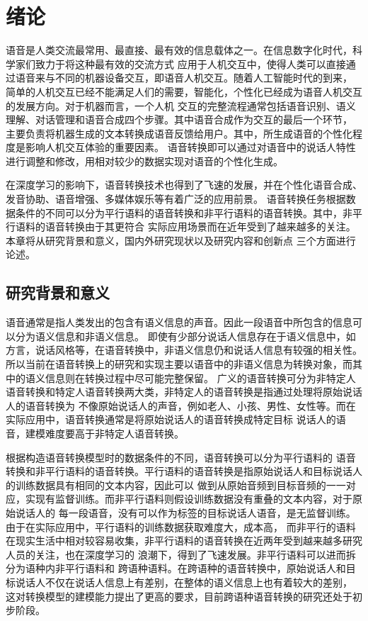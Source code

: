 \chapter{绪论}
语音是人类交流最常用、最直接、最有效的信息载体之一。在信息数字化时代，科学家们致力于将这种最有效的交流方式
应用于人机交互中，使得人类可以直接通过语音来与不同的机器设备交互，即语音人机交互。随着人工智能时代的到来，
简单的人机交互已经不能满足人们的需要，智能化，个性化已经成为语音人机交互的发展方向。对于机器而言，一个人机
交互的完整流程通常包括语音识别、语义理解、对话管理和语音合成四个步骤。其中语音合成作为交互的最后一个环节，
主要负责将机器生成的文本转换成语音反馈给用户。其中，所生成语音的个性化程度是影响人机交互体验的重要因素。
语音转换即可以通过对语音中的说话人特性进行调整和修改，用相对较少的数据实现对语音的个性化生成。

在深度学习的影响下，语音转换技术也得到了飞速的发展，并在个性化语音合成、发音协助、语音增强、多媒体娱乐等有着广泛的应用前景。
语音转换任务根据数据条件的不同可以分为平行语料的语音转换和非平行语料的语音转换。其中，非平行语料的语音转换由于其更符合
实际应用场景而在近年受到了越来越多的关注。本章将从研究背景和意义，国内外研究现状以及研究内容和创新点
三个方面进行论述。

\section{研究背景和意义}
语音通常是指人类发出的包含有语义信息的声音。因此一段语音中所包含的信息可以分为语义信息和非语义信息\cite{kinnunen2010overview, 刘蕊2009发声的生理结构和嗓音的保护}。
即使有少部分说话人信息存在于语义信息中，如方言，说话风格等，在语音转换中，非语义信息仍和说话人信息有较强的相关性\cite{Nurminen12}。
所以当前在语音转换上的研究和实现主要以语音中的非语义信息为转换对象，而其中的语义信息则在转换过程中尽可能完整保留。
广义的语音转换可分为非特定人语音转换和特定人语音转换两大类，非特定人的语音转换是指通过处理将原始说话人的语音转换为
不像原始说话人的声音，例如老人、小孩、男性、女性等。而在实际应用中，语音转换通常是将原始说话人的语音转换成特定目标
说话人的语音，建模难度要高于非特定人语音转换。

根据构造语音转换模型时的数据条件的不同，语音转换可以分为平行语料的
语音转换和非平行语料的语音转换。平行语料的语音转换是指原始说话人和目标说话人的训练数据具有相同的文本内容，因此可以
做到从原始音频到目标音频的一一对应，实现有监督训练。而非平行语料则假设训练数据没有重叠的文本内容，对于原始说话人的
每一段语音，没有可以作为标签的目标说话人语音，是无监督训练。由于在实际应用中，平行语料的训练数据获取难度大，成本高，
而非平行的语料在现实生活中相对较容易收集，非平行语料的语音转换在近两年受到越来越多研究人员的关注，也在深度学习的
浪潮下，得到了飞速发展。非平行语料可以进而拆分为语种内非平行语料和
跨语种语料。在跨语种的语音转换中，原始说话人和目标说话人不仅在说话人信息上有差别，在整体的语义信息上也有着较大的差别，
这对转换模型的建模能力提出了更高的要求，目前跨语种语音转换的研究还处于初步阶段。


